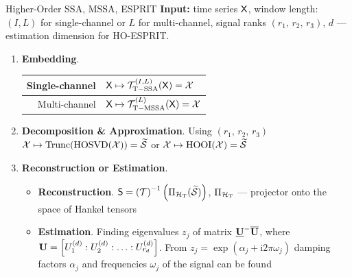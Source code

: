 \documentclass[pdf, unicode, ucs, notheorems]{beamer}
\theoremstyle{definition}
\begin{document}
\begin{frame}{Higher-Order SSA, MSSA, ESPRIT}
  \textbf{Input:} time series $\mathsf{X}$,
  window length: $(I, L)$ for single-channel or $L$ for multi-channel,
  signal ranks $(r_1,\, r_2,\, r_3)$, $d$ --- estimation dimension
  for HO-ESPRIT.
  \vspace{0.4cm}\\
  \begin{enumerate}
    \item \textbf{Embedding}.
      \begin{tabular}{r|l}
        Single-channel & $\mathsf{X} \mapsto\mathcal{T}_{\mathrm{T-SSA}}^{(I,
        L)}(\mathsf{X}) = \mathcal{X}$ \\ \hline
        Multi-channel &
        $\mathsf{X} \mapsto \mathcal{T}_{\mathrm{T-MSSA}}^{(L)}(\mathsf{X}) = \mathcal{X}$
      \end{tabular}
      \vspace{0.2cm}

    \item \textbf{Decomposition \& Approximation}. Using $(r_1,\,
      r_2,\, r_3)$\\\smallskip
      $\mathcal{X} \mapsto
      \operatorname{Trunc}(\operatorname{HOSVD}(\mathcal{X})) = \widetilde{\mathcal{S}}$ or
      $\mathcal{X} \mapsto \operatorname{HOOI}(\mathcal{X}) = \widetilde{\mathcal{S}}$
      \vspace{0.2cm}

    \item \textbf{Reconstruction or Estimation}. \\
      \begin{itemize}
        \item \textbf{Reconstruction}.
          $\mathsf{S} = \left(\mathcal{T}\right)^{-1}
          \left(\Pi_{\mathcal{H}_{\mathrm{T}}} (\widetilde{\mathcal{S}})\right)$,
          $\Pi_{\mathcal{H}_{\mathrm{T}}}$ --- projector onto the space of
          Hankel tensors
        \item \textbf{Estimation}. Finding eigenvalues $z_j$ of
          matrix $\underline{\mathbf{U}}^{-}\overline{\mathbf{U}}$, where
          $\mathbf{U} = \left[U_1^{(d)}:U_2^{(d)}:\ldots :U_{r_d}^{(d)}\right]$.
          From $z_j = \exp(\alpha_j + \mathrm{i}2\pi\omega_j)$
          damping factors $\alpha_j$ and frequencies $\omega_j$ of
          the signal can be found
      \end{itemize}
  \end{enumerate}
\end{frame}
\end{document}
